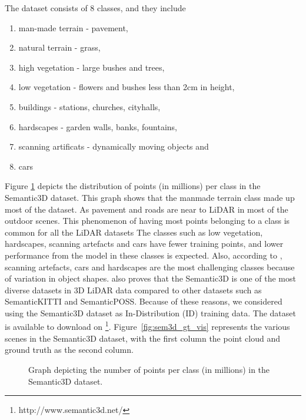     The dataset consists of 8 classes, and they include
\begin{enumerate}
    \item man-made terrain - pavement,
    \item natural terrain - grass,
    \item high vegetation - large bushes and trees,
    \item low vegetation - flowers and bushes less than 2cm in height,
    \item buildings - stations, churches, cityhalls,
    \item hardscapes - garden walls, banks, fountains,
    \item scanning artificats - dynamically moving objects and
    \item cars
\end{enumerate}
Figure \ref{fig:sem3ddist} depicts the distribution of points (in millions) per class in the Semantic3D dataset.
This graph shows that the manmade terrain class made up most of the dataset.
As pavement and roads are near to LiDAR in most of the outdoor scenes.
This phenomenon of having most points belonging to a class is common for all the LiDAR datasets 
The classes such as low vegetation, hardscapes, scanning artefacts and cars have fewer training points, and lower performance from the model in these classes is expected.
Also, according to \cite{hackel2017semantic3d}, scanning artefacts, cars and hardscapes are the most challenging classes because of variation in object shapes.
\cite{survey3d} also proves that the Semantic3D is one of the most diverse datasets in 3D LiDAR data compared to other datasets such as SemanticKITTI and SemanticPOSS.
Because of these reasons, we considered using the Semantic3D dataset as In-Distribution (ID) training data.
The dataset is available to download on \footnote[1]{http://www.semantic3d.net/}. 
Figure~\ref{fig:sem3d_gt_vis} represents the various scenes in the Semantic3D dataset, with the first column the point cloud and ground truth as the second column.
\begin{figure}[h!]
    \centering
    
    \caption{Graph depicting the number of points per class (in millions) in the Semantic3D dataset.}
    \label{fig:sem3ddist}
\end{figure}


